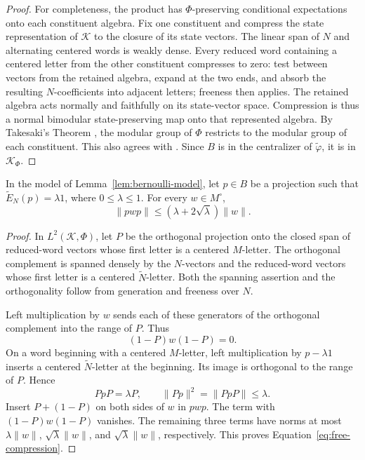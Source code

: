 \begin{proof}
For completeness, the product has $\Phi$-preserving conditional
expectations onto each constituent algebra. Fix one constituent and
compress the state representation of $\mathcal K$ to the closure of
its state vectors. The linear span of $N$ and alternating centered
words is weakly dense. Every reduced word containing a centered letter
from the other constituent compresses to zero: test between vectors
from the retained algebra, expand at the two ends, and absorb the
resulting $N$-coefficients into adjacent letters; freeness then applies.
The retained algebra acts normally and faithfully on its state-vector
space. Compression is thus a normal bimodular state-preserving map
onto that represented algebra. By Takesaki's Theorem
\cite{Tak72}, the modular group of $\Phi$ restricts to the modular group
of each constituent. This also agrees with
\cite[Equation~(2.1)]{Ued13}. Since $B$ is in the centralizer of
$\widetilde\varphi$, it is in $\mathcal K_\Phi$.
\end{proof}

\begin{lemma}
\label{lem:free-compression}
In the model of Lemma~\ref{lem:bernoulli-model}, let $p\in B$ be a
projection such that $\widetilde E_N(p)=\lambda1$, where
$0\le\lambda\le1$. For every $w\in M^\circ$,
\begin{equation}
 \|pwp\|\le(\lambda+2\sqrt\lambda)\|w\|.
 \label{eq:free-compression}
\end{equation}
\end{lemma}

\begin{proof}
In $L^2(\mathcal K,\Phi)$, let $P$ be the orthogonal projection onto the
closed span of reduced-word vectors whose first letter is a centered
$M$-letter. The orthogonal complement is spanned densely by the
$N$-vectors and the reduced-word vectors whose first letter is a
centered $\widetilde N$-letter. Both the spanning assertion and the
orthogonality follow from generation and freeness over $N$.

Left multiplication by $w$ sends each of these generators of the
orthogonal complement into the range of $P$. Thus
\[
 (1-P)w(1-P)=0.
\]
On a word beginning with a centered $M$-letter, left multiplication by
$p-\lambda1$ inserts a centered $\widetilde N$-letter at the beginning.
Its image is orthogonal to the range of $P$. Hence
\[
 PpP=\lambda P,
 \qquad
 \|Pp\|^2=\|PpP\|\le\lambda.
\]
Insert $P+(1-P)$ on both sides of $w$ in $pwp$. The term with
$(1-P)w(1-P)$ vanishes. The remaining three terms have norms at most
$\lambda\|w\|$, $\sqrt\lambda\|w\|$, and
$\sqrt\lambda\|w\|$, respectively. This proves
Equation~\eqref{eq:free-compression}.
\end{proof}

